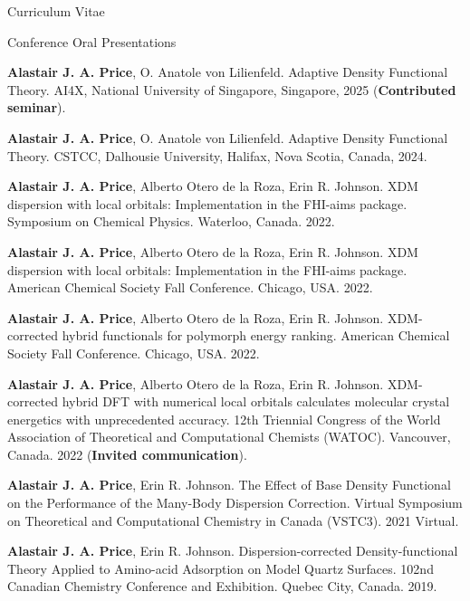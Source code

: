 \documentclass[a4paper,oneside,11pt]{article}
\begin{document}
\begin{cv}{Curriculum Vitae}
\setlength{\cvlabelwidth}{0.5cm}  \begin{cvlist}{Conference Oral Presentations}

     \item[8.] \textbf{Alastair J. A. Price}, O. Anatole von Lilienfeld. Adaptive Density Functional Theory. AI4X, National University of Singapore, Singapore, 2025 ({\bf Contributed seminar}).
     \item[7.] \textbf{Alastair J. A. Price}, O. Anatole von Lilienfeld. Adaptive Density Functional Theory. CSTCC, Dalhousie University, Halifax, Nova Scotia, Canada, 2024.
      \item[6.] \textbf{Alastair J. A. Price}, Alberto Otero de la Roza, Erin R. Johnson. XDM dispersion with local orbitals: Implementation in the FHI-aims package. Symposium on Chemical Physics. Waterloo, Canada. 2022.
      \item[5.] \textbf{Alastair J. A. Price}, Alberto Otero de la Roza, Erin R. Johnson. XDM dispersion with local orbitals: Implementation in the FHI-aims package. American Chemical Society Fall Conference. Chicago, USA. 2022.
      \item[4.] \textbf{Alastair J. A. Price}, Alberto Otero de la Roza, Erin R. Johnson. XDM-corrected hybrid functionals for polymorph energy ranking. American Chemical Society Fall Conference. Chicago, USA. 2022.
      \item[3.] \textbf{Alastair J. A. Price}, Alberto Otero de la Roza, Erin R. Johnson. XDM-corrected hybrid DFT with numerical local orbitals calculates molecular crystal energetics with unprecedented accuracy. 12th Triennial Congress of the World Association of Theoretical and Computational Chemists (WATOC). Vancouver, Canada. 2022 ({\bf Invited communication}).
      \item[2.] \textbf{Alastair J. A. Price}, Erin R. Johnson. The Effect of Base Density Functional on the Performance of the Many-Body Dispersion Correction. Virtual Symposium on Theoretical and Computational Chemistry in Canada (VSTC3). 2021 Virtual.
      \item[1.] \textbf{Alastair J. A. Price}, Erin R. Johnson. Dispersion-corrected Density-functional Theory Applied to Amino-acid Adsorption on Model Quartz Surfaces. 102nd Canadian Chemistry Conference and Exhibition. Quebec City, Canada. 2019.
  \end{cvlist}


\end{cv}
\end{document}
